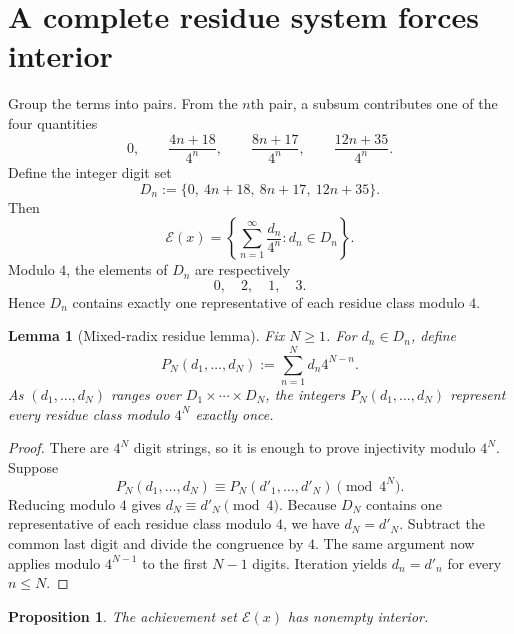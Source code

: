 \documentclass[11pt,letterpaper]{article}
\theoremstyle{metriqthm}
\newtheorem{lemma}[theorem]{Lemma}
\newtheorem{proposition}[theorem]{Proposition}
\theoremstyle{metriqdef}
\newcommand{\E}{\mathcal{E}}
\begin{document}
\section{A complete residue system forces interior}

Group the terms into pairs. From the $n$th pair, a subsum contributes one of the four quantities
\[
  0,
  \qquad
  \frac{4n+18}{4^n},
  \qquad
  \frac{8n+17}{4^n},
  \qquad
  \frac{12n+35}{4^n}.
\]
Define the integer digit set
\begin{equation}\label{eq:digits}
  D_n:=\{0,\ 4n+18,\ 8n+17,\ 12n+35\}.
\end{equation}
Then
\begin{equation}\label{eq:digit-representation}
  \E(x)
  =
  \left\{
    \sum_{n=1}^{\infty}\frac{d_n}{4^n}:d_n\in D_n
  \right\}.
\end{equation}
Modulo $4$, the elements of $D_n$ are respectively
\[
  0,\quad2,\quad1,\quad3.
\]
Hence $D_n$ contains exactly one representative of each residue class modulo $4$.

\begin{lemma}[Mixed-radix residue lemma]\label{lem:residues}
Fix $N\ge1$. For $d_n\in D_n$, define
\[
  P_N(d_1,\ldots,d_N)
  :=\sum_{n=1}^{N}d_n4^{N-n}.
\]
As $(d_1,\ldots,d_N)$ ranges over $D_1\times\cdots\times D_N$, the integers $P_N(d_1,\ldots,d_N)$ represent every residue class modulo $4^N$ exactly once.
\end{lemma}

\begin{proof}
There are $4^N$ digit strings, so it is enough to prove injectivity modulo $4^N$. Suppose
\[
  P_N(d_1,\ldots,d_N)
  \equiv
  P_N(d'_1,\ldots,d'_N)
  \pmod{4^N}.
\]
Reducing modulo $4$ gives $d_N\equiv d'_N\pmod4$. Because $D_N$ contains one representative of each residue class modulo $4$, we have $d_N=d'_N$. Subtract the common last digit and divide the congruence by $4$. The same argument now applies modulo $4^{N-1}$ to the first $N-1$ digits. Iteration yields $d_n=d'_n$ for every $n\le N$.
\end{proof}

\begin{proposition}\label{prop:interior}
The achievement set $\E(x)$ has nonempty interior.
\end{proposition}
\end{document}
